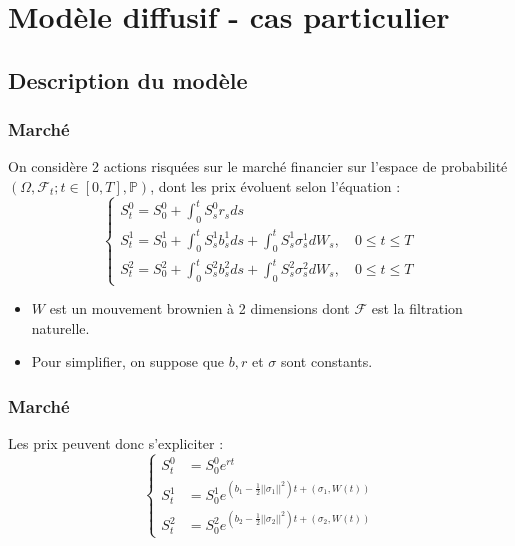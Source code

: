 \documentclass{beamer}
\begin{document}
\section{Modèle diffusif - cas particulier}

\subsection{Description du modèle}

\begin{frame}
\frametitle{Marché}
On considère 2 actions risquées sur le marché financier sur l'espace de probabilité $(\Omega, \mathcal{F}_t; t \in[0, T], \mathbb{P})$, dont les prix évoluent selon l'équation : 
\begin{equation*}
\begin{cases} 
S^0_t = S^0_0 +  \int_{0}^{t} S^0_s r_s ds \\
S^1_t = S^1_0 + \int_{0}^{t} S^1_s b^1_s ds + \int_{0}^{t} S^1_s \sigma^1_s dW_s, \quad 0 \leq t \leq T\\
S^2_t = S^2_0 + \int_{0}^{t} S^2_s b^2_s ds + \int_{0}^{t} S^2_s \sigma^2_s dW_s, \quad 0 \leq t \leq T
\end{cases}
\end{equation*}
\begin{itemize}
\item $W$ est un mouvement brownien à 2 dimensions dont $\mathcal{F}$ est la filtration naturelle.\\
\item Pour simplifier, on suppose que $b, r$ et $\sigma$ sont constants.
\end{itemize}
\end{frame}

\begin{frame}
\frametitle{Marché}
Les prix peuvent donc s'expliciter : 
\begin{displaymath}
\begin{cases}
S_t^0 &= S_0^0 e^{ r t } \\
S_t^1 &= S_0^1 e^{ \left( b_1 - \frac{1}{2} ||\sigma_1||^2 \right) t + \left( \sigma_1, W \left( t \right) \right) }  \\
S_t^2 &= S_0^2 e^{ \left( b_2 - \frac{1}{2} ||\sigma_2||^2 \right) t + \left( \sigma_2, W \left( t \right) \right) }
\end{cases}
\end{displaymath}

\end{frame}
\end{document}
